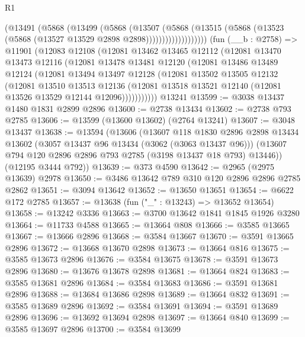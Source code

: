 \begin{lexlean}{R1}
\begin{coremodule}
                    (@13491
                      (@5868
                        (@13499
                          (@5868
                            (@13507
                              (@5868
                                (@13515
                                  (@5868
                                    (@13523 (@5868 (@13527 @13529 @2898 @2898)))))))))))))))))))
    (fun (__b : @2758) =>
    @11901
      (@12083
        @12108
        (@12081
          @13462
          @13465
          @12112
          (@12081
            @13470
            @13473
            @12116
            (@12081
              @13478
              @13481
              @12120
              (@12081
                @13486
                @13489
                @12124
                (@12081
                  @13494
                  @13497
                  @12128
                  (@12081
                    @13502
                    @13505
                    @12132
                    (@12081
                      @13510
                      @13513
                      @12136
                      (@12081 @13518 @13521 @12140 (@12081 @13526 @13529 @12144 @12096)))))))))))
    @13241
@13599 := @3038 @13437 @1480 @1831 @2899 @2896
@13600 := @2738 @13434
@13602 := @2738 @793 @2785
@13606 := @13599 (@13600 @13602) (@2764 @13241)
@13607 := @3048 @13437
@13638 := @13594
    (@13606
      (@13607
        @118
        @1830
        @2896
        @2898
        @13434
        @13602
        (@3057 @13437 @96 @13434 (@3062 (@3063 @13437 @96)))
        (@13607 @794 @120 @2896 @2896 @793 @2785 (@3198 @13437 @18 @793) @13446))
      (@12195 @3444 @792))
@13639 := @373 @4590
@13642 := @2965 (@2975 @13639) @2978
@13650 := @3486 @13642 @789 @310 @120 @2896 @2896 @2785 @2862
@13651 := @3094 @13642
@13652 := @13650 @13651
@13654 := @6622 @172 @2785
@13657 := @13638 (fun ("_" : @13243) => @13652 @13654)
@13658 := @13242 @3336
@13663 := @3700 @13642 @1841 @1845 @1926 @3280
@13664 := @11733 @4588
@13665 := @13664 @808
@13666 := @3585 @13665
@13667 := @13666 @2896
@13668 := @3584 @13667
@13670 := @3591 @13665 @2896
@13672 := @13668 @13670 @2898
@13673 := @13664 @816
@13675 := @3585 @13673 @2896
@13676 := @3584 @13675
@13678 := @3591 @13673 @2896
@13680 := @13676 @13678 @2898
@13681 := @13664 @824
@13683 := @3585 @13681 @2896
@13684 := @3584 @13683
@13686 := @3591 @13681 @2896
@13688 := @13684 @13686 @2898
@13689 := @13664 @832
@13691 := @3585 @13689 @2896
@13692 := @3584 @13691
@13694 := @3591 @13689 @2896
@13696 := @13692 @13694 @2898
@13697 := @13664 @840
@13699 := @3585 @13697 @2896
@13700 := @3584 @13699

\end{coremodule}
\end{lexlean}
